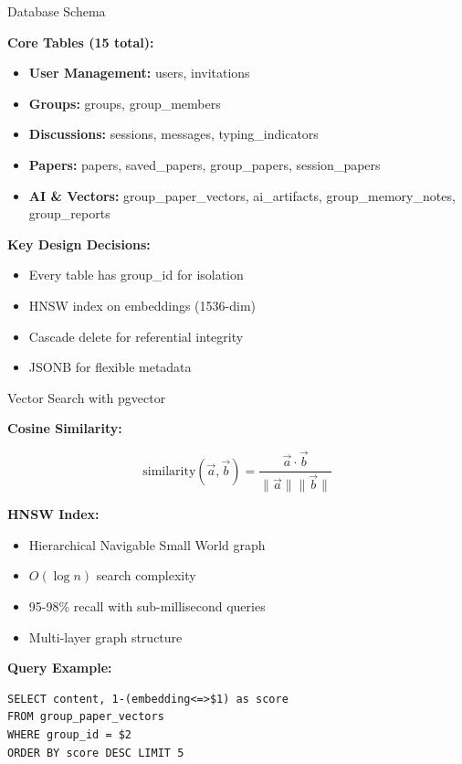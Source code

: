 \documentclass{beamer}
\begin{document}
\begin{frame}{Database Schema}

\textbf{Core Tables (15 total):}

\begin{itemize}
    \item \textbf{User Management:} users, invitations
    \item \textbf{Groups:} groups, group\_members
    \item \textbf{Discussions:} sessions, messages, typing\_indicators
    \item \textbf{Papers:} papers, saved\_papers, group\_papers, session\_papers
    \item \textbf{AI \& Vectors:} group\_paper\_vectors, ai\_artifacts, group\_memory\_notes, group\_reports
\end{itemize}

\vspace{0.3cm}

\textbf{Key Design Decisions:}
\begin{itemize}
    \item Every table has group\_id for isolation
    \item HNSW index on embeddings (1536-dim)
    \item Cascade delete for referential integrity
    \item JSONB for flexible metadata
\end{itemize}

\end{frame}

\begin{frame}{Vector Search with pgvector}

\textbf{Cosine Similarity:}

$$
\text{similarity}(\vec{a}, \vec{b}) = \frac{\vec{a} \cdot \vec{b}}{\|\vec{a}\| \|\vec{b}\|}
$$

\textbf{HNSW Index:}
\begin{itemize}
    \item Hierarchical Navigable Small World graph
    \item $O(\log n)$ search complexity
    \item 95-98\% recall with sub-millisecond queries
    \item Multi-layer graph structure
\end{itemize}

\vspace{0.3cm}

\textbf{Query Example:}
\begin{verbatim}
SELECT content, 1-(embedding<=>$1) as score
FROM group_paper_vectors
WHERE group_id = $2
ORDER BY score DESC LIMIT 5
\end{verbatim}

\end{frame}
\end{document}

